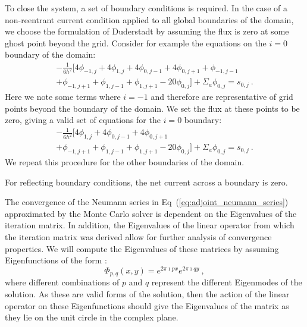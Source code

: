 \documentclass{mc2013}
\begin{document}
To close the system, a set of boundary conditions is required. In the
case of a non-reentrant current condition applied to all global
boundaries of the domain, we choose the formulation of Duderstadt by
assuming the flux is zero at some ghost point beyond the
grid. Consider for example the equations on the $i=0$ boundary of the
domain:
\begin{multline}
  -\frac{1}{6h^2}[4 \phi_{-1,j} + 4 \phi_{1,j} + 4 \phi_{0,j-1} +
    4 \phi_{0,j+1} + \phi_{-1,j-1}\\ + \phi_{-1,j+1} + \phi_{1,j-1} +
    \phi_{1,j+1} - 20 \phi_{0,j}] + \Sigma_a \phi_{0,j} = s_{0,j}\:.
  \label{eq:x_min_bnd}
\end{multline}
Here we note some terms where $i=-1$ and therefore are representative
of grid points beyond the boundary of the domain. We set the flux at
these points to be zero, giving a valid set of equations for the $i=0$
boundary:
\begin{multline}
  -\frac{1}{6h^2}[4 \phi_{1,j} + 4 \phi_{0,j-1} + 4 \phi_{0,j+1}
    \\ + \phi_{-1,j+1} + \phi_{1,j-1} + \phi_{1,j+1} - 20 \phi_{0,j}]
  + \Sigma_a \phi_{0,j} = s_{0,j}\:.
  \label{eq:x_min_bnd_2}
\end{multline}
We repeat this procedure for the other boundaries of the domain.

For reflecting boundary conditions, the net current across a boundary
is zero.

\label{sec:spectral_analysis}

The convergence of the Neumann series in
Eq~(\ref{eq:adjoint_neumann_series}) approximated by the Monte Carlo
solver is dependent on the Eigenvalues of the iteration matrix. In
addition, the Eigenvalues of the linear operator from which the
iteration matrix was derived allow for further analysis of convergence
properties. We will compute the Eigenvalues of these matrices by
assuming Eigenfunctions of the form \cite{leveque_finite_2007}:
\begin{equation}
  \Phi_{p,q}(x,y) = e^{2 \pi \imath p x} e^{2 \pi \imath q y}\:,
  \label{eq:eigenfunction_form}
\end{equation}
where different combinations of $p$ and $q$ represent the different
Eigenmodes of the solution. As these are valid forms of the solution,
then the action of the linear operator on these Eigenfunctions should
give the Eigenvalues of the matrix as they lie on the unit circle in
the complex plane.
\end{document}
